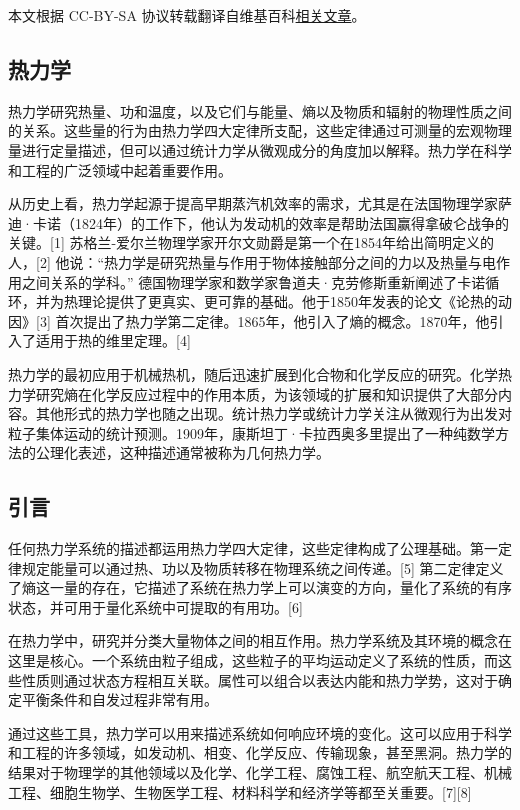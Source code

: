 
本文根据 CC-BY-SA 协议转载翻译自维基百科\href{https://en.wikipedia.org/wiki/Thermodynamics}{相关文章}。

\subsection{热力学}
热力学研究热量、功和温度，以及它们与能量、熵以及物质和辐射的物理性质之间的关系。这些量的行为由热力学四大定律所支配，这些定律通过可测量的宏观物理量进行定量描述，但可以通过统计力学从微观成分的角度加以解释。热力学在科学和工程的广泛领域中起着重要作用。

从历史上看，热力学起源于提高早期蒸汽机效率的需求，尤其是在法国物理学家萨迪·卡诺（1824年）的工作下，他认为发动机的效率是帮助法国赢得拿破仑战争的关键。[1] 苏格兰-爱尔兰物理学家开尔文勋爵是第一个在1854年给出简明定义的人，[2] 他说：“热力学是研究热量与作用于物体接触部分之间的力以及热量与电作用之间关系的学科。” 德国物理学家和数学家鲁道夫·克劳修斯重新阐述了卡诺循环，并为热理论提供了更真实、更可靠的基础。他于1850年发表的论文《论热的动因》[3] 首次提出了热力学第二定律。1865年，他引入了熵的概念。1870年，他引入了适用于热的维里定理。[4]

热力学的最初应用于机械热机，随后迅速扩展到化合物和化学反应的研究。化学热力学研究熵在化学反应过程中的作用本质，为该领域的扩展和知识提供了大部分内容。其他形式的热力学也随之出现。统计热力学或统计力学关注从微观行为出发对粒子集体运动的统计预测。1909年，康斯坦丁·卡拉西奥多里提出了一种纯数学方法的公理化表述，这种描述通常被称为几何热力学。
\subsection{引言}
任何热力学系统的描述都运用热力学四大定律，这些定律构成了公理基础。第一定律规定能量可以通过热、功以及物质转移在物理系统之间传递。[5] 第二定律定义了熵这一量的存在，它描述了系统在热力学上可以演变的方向，量化了系统的有序状态，并可用于量化系统中可提取的有用功。[6]

在热力学中，研究并分类大量物体之间的相互作用。热力学系统及其环境的概念在这里是核心。一个系统由粒子组成，这些粒子的平均运动定义了系统的性质，而这些性质则通过状态方程相互关联。属性可以组合以表达内能和热力学势，这对于确定平衡条件和自发过程非常有用。

通过这些工具，热力学可以用来描述系统如何响应环境的变化。这可以应用于科学和工程的许多领域，如发动机、相变、化学反应、传输现象，甚至黑洞。热力学的结果对于物理学的其他领域以及化学、化学工程、腐蚀工程、航空航天工程、机械工程、细胞生物学、生物医学工程、材料科学和经济学等都至关重要。[7][8]

